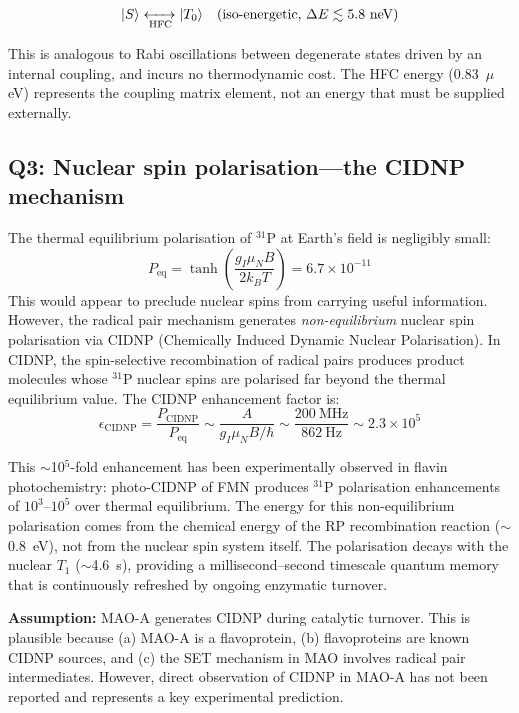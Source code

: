 \documentclass[11pt]{article}
\begin{document}
\begin{equation}
|S\rangle \xleftrightarrow[\text{HFC}]{} |T_0\rangle \quad \text{(iso-energetic, } \Delta E \lesssim 5.8\text{ neV)}
\label{eq:ST_isoenergetic}
\end{equation}

This is analogous to Rabi oscillations between degenerate states driven by an internal coupling, and incurs no thermodynamic cost. The HFC energy (0.83~$\mu$eV) represents the coupling matrix element, not an energy that must be supplied externally.

\subsection{Q3: Nuclear spin polarisation---the CIDNP mechanism}

The thermal equilibrium polarisation of $^{31}$P at Earth's field is negligibly small:
\begin{equation}
P_\mathrm{eq} = \tanh\!\left(\frac{g_I \mu_N B}{2k_BT}\right) = 6.7 \times 10^{-11}
\label{eq:thermal_pol}
\end{equation}
This would appear to preclude nuclear spins from carrying useful information. However, the radical pair mechanism generates \emph{non-equilibrium} nuclear spin polarisation via CIDNP (Chemically Induced Dynamic Nuclear Polarisation)\cite{Closs1969,Kaptein1969}. In CIDNP, the spin-selective recombination of radical pairs produces product molecules whose $^{31}$P nuclear spins are polarised far beyond the thermal equilibrium value. The CIDNP enhancement factor is:
\begin{equation}
\epsilon_\mathrm{CIDNP} = \frac{P_\mathrm{CIDNP}}{P_\mathrm{eq}} \sim \frac{A}{g_I\mu_N B / \hbar} \sim \frac{200~\text{MHz}}{862~\text{Hz}} \sim 2.3 \times 10^5
\label{eq:cidnp}
\end{equation}

This $\sim$10$^5$-fold enhancement has been experimentally observed in flavin photochemistry\cite{Tsentalovich2002}: photo-CIDNP of FMN produces $^{31}$P polarisation enhancements of $10^3$--$10^5$ over thermal equilibrium. The energy for this non-equilibrium polarisation comes from the chemical energy of the RP recombination reaction ($\sim$0.8~eV), not from the nuclear spin system itself. The polarisation decays with the nuclear $T_1$ ($\sim$4.6~s), providing a millisecond--second timescale quantum memory that is continuously refreshed by ongoing enzymatic turnover.

\textbf{Assumption:} MAO-A generates CIDNP during catalytic turnover. This is plausible because (a) MAO-A is a flavoprotein, (b) flavoproteins are known CIDNP sources\cite{Tsentalovich2002}, and (c) the SET mechanism in MAO involves radical pair intermediates\cite{Edmondson2004}. However, direct observation of CIDNP in MAO-A has not been reported and represents a key experimental prediction.
\end{document}
